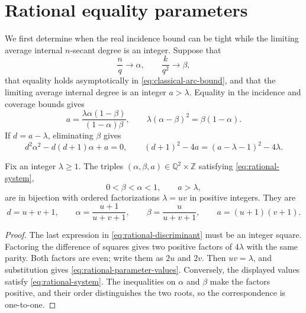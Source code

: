 \section{Rational equality parameters}\label{sec:rational-parameters}

We first determine when the real incidence bound can be tight while the
limiting average internal \(n\)-secant degree is an integer.
Suppose that
\[
 \frac nq\longrightarrow\alpha,\qquad
 \frac{k}{q^2}\longrightarrow\beta,
\]
that equality holds asymptotically in \eqref{eq:classical-arc-bound}, and that
the limiting average internal degree is an integer \(a>\lambda\).  Equality in
the incidence and coverage bounds gives
\begin{equation}\label{eq:rational-system}
 a=\frac{\lambda\alpha(1-\beta)}{(1-\alpha)\beta},
 \qquad
 \lambda(\alpha-\beta)^2=\beta(1-\alpha).
\end{equation}
If \(d=a-\lambda\), eliminating \(\beta\) gives
\begin{equation}\label{eq:rational-discriminant}
 d^2\alpha^2-d(d+1)\alpha+a=0,
 \qquad
 (d+1)^2-4a=(a-\lambda-1)^2-4\lambda.
\end{equation}

\begin{lemma}
\label{lem:rational-parameters}
Fix an integer \(\lambda\ge1\).  The triples
\((\alpha,\beta,a)\in\mathbb Q^2\times\mathbb Z\) satisfying
\eqref{eq:rational-system},
\[
 0<\beta<\alpha<1,\qquad a>\lambda,
\]
are in bijection with ordered factorizations \(\lambda=uv\) in positive
integers.  They are
\begin{equation}\label{eq:rational-parameter-values}
 d=u+v+1,\qquad
 \alpha=\frac{u+1}{u+v+1},\qquad
 \beta=\frac{u}{u+v+1},\qquad
 a=(u+1)(v+1).
\end{equation}
\end{lemma}

\begin{proof}
The last expression in \eqref{eq:rational-discriminant} must be an integer
square.
Factoring the difference of squares gives two positive factors of
\(4\lambda\) with the same parity.  Both factors are even; write them as
\(2u\) and \(2v\).  Then \(uv=\lambda\), and substitution gives
\eqref{eq:rational-parameter-values}.  Conversely, the displayed values
satisfy \eqref{eq:rational-system}.  The inequalities on \(\alpha\) and
\(\beta\) make the factors positive, and their order distinguishes the two
roots, so the correspondence is one-to-one.
\end{proof}

